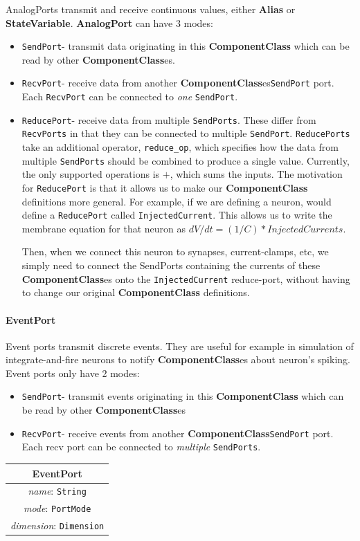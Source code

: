 \documentclass{article}
\newcommand{\ComponentClass}{{\bf{ComponentClass}}\xspace}
\newcommand{\ComponentClasses}{{\bf{ComponentClass}}es\xspace}
\newcommand{\StateVariable}{{\bf{StateVariable}}\xspace}
\newcommand{\Alias}{{\bf{Alias}}\xspace}
\newcommand{\AnalogPort}{{\bf{AnalogPort}}\xspace}
\newcommand{\SendPort}{{\tt{SendPort}}\xspace}
\newcommand{\RecvPort}{{\tt{RecvPort}}\xspace}
\newcommand{\ReducePort}{{\tt{ReducePort}}\xspace}
\newcommand{\SendPorts}{{\tt{SendPorts}}\xspace}
\newcommand{\RecvPorts}{{\tt{RecvPorts}}\xspace}
\newcommand{\ReducePorts}{{\tt{ReducePorts}}\xspace}
\begin{document}
AnalogPorts transmit and receive continuous values, either \Alias
or \StateVariable. \AnalogPort can have 3 modes:
\begin{itemize}
\item \SendPort - transmit data originating in this \ComponentClass which can
be read by other \ComponentClasses.
\item \RecvPort - receive data from another \ComponentClasses \SendPort
port. Each \RecvPort can be connected to \emph{one} \SendPort.
\item \ReducePort - receive data from multiple \SendPorts. These
differ from \RecvPorts in that they can be connected to multiple
\SendPort. \ReducePorts take an additional operator,
{\tt reduce\_op}, which specifies how the data from multiple \SendPorts
should be combined to produce a single value. Currently, the
only supported operations is $+$, which sums the inputs.
The motivation for \ReducePort is that it allows us to make our
\ComponentClass definitions more general. For example, if we are defining a
neuron, would define a \ReducePort called {\tt InjectedCurrent}.
This allows us to write the membrane equation for that neuron as
$dV/dt = (1/C) * InjectedCurrents$.

Then, when we connect this neuron to synapses, current-clamps, etc, we
simply need to connect the SendPorts containing the currents of these
\ComponentClasses onto the {\tt InjectedCurrent} reduce-port, without having
to change our original \ComponentClass definitions.
\end{itemize}

\paragraph{EventPort}

Event ports transmit discrete events. They are useful for example in
simulation of integrate-and-fire neurons to notify \ComponentClasses about neuron's
spiking. Event ports only have 2 modes:

\begin{itemize}
\item \SendPort - transmit events originating in this \ComponentClass which can be
read by
other \ComponentClasses
\item \RecvPort - receive events from another \ComponentClass \SendPort port.
Each recv port can be connected to \emph{multiple} \SendPorts.
\end{itemize}

\begin{table}[htb]
\center
\begin{tabular}{|c|}
\hline
\hline
EventPort \\
\hline
\hline
{\em name}: {\tt String} \\
\hline
{\em mode}: {\tt PortMode} \\
\hline
{\em dimension}: {\tt Dimension} \\
\hline
\end{tabular}
\end{table}
\end{document}
